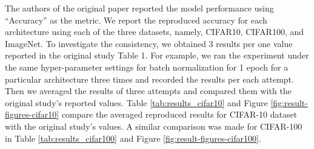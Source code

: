 The authors of the original paper reported the model performance using \enquote{Accuracy} as the metric. We report the reproduced accuracy for each architecture using each of the three datasets, namely, CIFAR10, CIFAR100, and ImageNet. To investigate the consistency, we obtained 3 results per one value reported in the original study Table 1. For example, we ran the experiment under the same hyper-parameter settings for batch normalization for 1 epoch for a particular architecture three times and recorded the results per each attempt. Then we averaged the results of three attempts and compared them with the original study's reported values. Table \ref{tab:results_cifar10} and Figure \ref{fig:result-figures-cifar10} compare the averaged reproduced results for CIFAR-10 dataset with the original study's values. A similar comparison was made for CIFAR-100 in Table \ref{tab:results_cifar100} and Figure \ref{fig:result-figures-cifar100}. 





